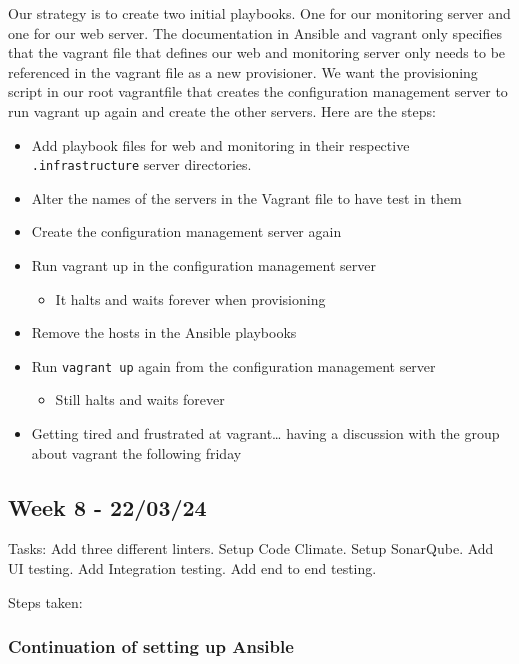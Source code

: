 Our strategy is to create two initial playbooks. One for our monitoring
server and one for our web server. The documentation in Ansible and
vagrant only specifies that the vagrant file that defines our web and
monitoring server only needs to be referenced in the vagrant file as a
new provisioner. We want the provisioning script in our root vagrantfile
that creates the configuration management server to run vagrant up again
and create the other servers. Here are the steps:

\begin{itemize}
    \item Add playbook files for web and monitoring in their respective \texttt{.infrastructure} server directories.
    \item Alter the names of the servers in the Vagrant file to have test in them
    \item Create the configuration management server again
    \item Run vagrant up in the configuration management server

    \begin{itemize}
        \item It halts and waits forever when provisioning
    \end{itemize}
    \item Remove the hosts in the Ansible playbooks
    \item Run \texttt{vagrant\ up} again from the configuration management server

    \begin{itemize}
        \item Still halts and waits forever
    \end{itemize}
    \item Getting tired and frustrated at vagrant\ldots{} having a discussion with the group about vagrant the following friday
\end{itemize}

\subsection{Week 8 - 22/03/24}
\label{log:week8}

Tasks: Add three different linters. Setup Code Climate. Setup SonarQube.
Add UI testing. Add Integration testing. Add end to end testing.

Steps taken:

\subsubsection{Continuation of setting up Ansible}
\label{log:continuation-of-setting-up-ansible}

